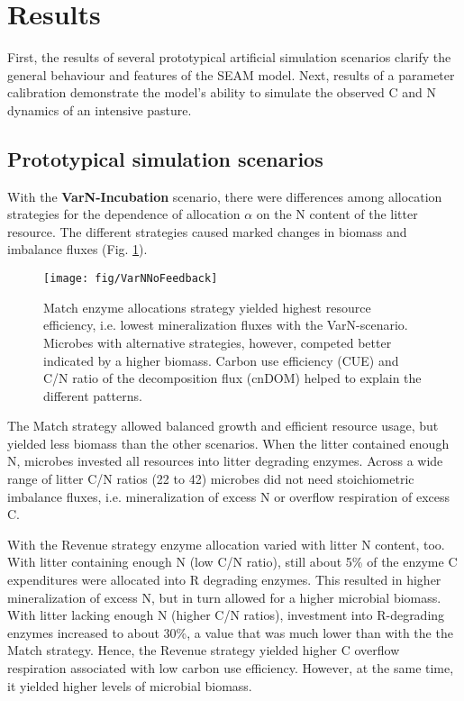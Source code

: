  
\section{Results}

First, the results of several prototypical artificial simulation scenarios
clarify the general behaviour and features of the SEAM model. Next, results of a
parameter calibration demonstrate the model's ability to
simulate the observed C and N dynamics of an intensive pasture.

\subsection{Prototypical simulation scenarios}
\label{sec:ResultsProto}

With the \textbf{VarN-Incubation} scenario, there were differences among
allocation strategies for the dependence of allocation $\alpha$ on the N
content of the litter resource. The different strategies caused marked changes
in biomass and imbalance fluxes (Fig. \ref{fig:VarNNoFeedback}).
 
\begin{figure}[t] \vspace*{2mm}
\begin{center}
\texttt{[image: fig/VarNNoFeedback]}
\end{center}
\caption{
Match enzyme allocations strategy yielded highest resource efficiency, i.e.
lowest mineralization fluxes with the VarN-scenario. Microbes with alternative
strategies, however, competed better indicated by a higher biomass. Carbon use
efficiency (CUE) and C/N ratio of the decomposition flux (cnDOM) helped to
explain the different patterns.
\label{fig:VarNNoFeedback}}
\end{figure}

The Match strategy allowed balanced growth and efficient resource usage, but
yielded less biomass than the other scenarios. When the litter contained enough
N, microbes invested all resources into litter degrading enzymes.
Across a wide range of litter C/N ratios (22 to 42) microbes did not need
stoichiometric imbalance fluxes, i.e. mineralization of excess N
or overflow respiration of excess C.  

With the Revenue strategy enzyme allocation varied with litter N content, too.
With litter containing enough N (low C/N ratio), still about 5\% of the enzyme C
expenditures were allocated into R degrading enzymes. This resulted in higher
mineralization of excess N, but in turn allowed for a higher microbial biomass.
With litter lacking enough N (higher C/N ratios), investment into R-degrading enzymes
increased to about 30\%, a value that was much lower than with the the Match
strategy. Hence, the Revenue strategy yielded higher C overflow respiration
associated with low carbon use efficiency. However, at the same time, it
yielded higher levels of microbial biomass.

